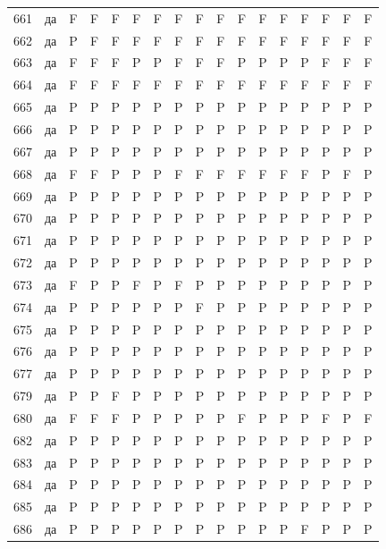 \begin{table}[p]
\begin{tabular*}{\textwidth}{@{\extracolsep{\fill}}rcccccccccccccccc}
661 & да & F & F & F & F & F & F & F & F & F & F & F & F & F & F & F\\
662 & да & P & F & F & F & F & F & F & F & F & F & F & F & F & F & F\\
663 & да & F & F & F & P & P & F & F & F & P & P & P & P & F & F & F\\
664 & да & F & F & F & F & F & F & F & F & F & F & F & F & F & F & F\\
665 & да & P & P & P & P & P & P & P & P & P & P & P & P & P & P & P\\
666 & да & P & P & P & P & P & P & P & P & P & P & P & P & P & P & P\\
667 & да & P & P & P & P & P & P & P & P & P & P & P & P & P & P & P\\
668 & да & F & F & P & P & P & F & F & F & F & F & F & F & P & F & P\\
669 & да & P & P & P & P & P & P & P & P & P & P & P & P & P & P & P\\
670 & да & P & P & P & P & P & P & P & P & P & P & P & P & P & P & P\\
671 & да & P & P & P & P & P & P & P & P & P & P & P & P & P & P & P\\
672 & да & P & P & P & P & P & P & P & P & P & P & P & P & P & P & P\\
673 & да & F & P & P & F & P & F & P & P & P & P & P & P & P & P & P\\
674 & да & P & P & P & P & P & P & F & P & P & P & P & P & P & P & P\\
675 & да & P & P & P & P & P & P & P & P & P & P & P & P & P & P & P\\
676 & да & P & P & P & P & P & P & P & P & P & P & P & P & P & P & P\\
677 & да & P & P & P & P & P & P & P & P & P & P & P & P & P & P & P\\
679 & да & P & P & F & P & P & P & P & P & P & P & P & P & P & P & P\\
680 & да & F & F & F & P & P & P & P & P & F & P & P & P & F & P & F\\
682 & да & P & P & P & P & P & P & P & P & P & P & P & P & P & P & P\\
683 & да & P & P & P & P & P & P & P & P & P & P & P & P & P & P & P\\
684 & да & P & P & P & P & P & P & P & P & P & P & P & P & P & P & P\\
685 & да & P & P & P & P & P & P & P & P & P & P & P & P & P & P & P\\
686 & да & P & P & P & P & P & P & P & P & P & P & P & F & P & P & P\\
\bottomrule\end{tabular*}\end{table}
\clearpage

